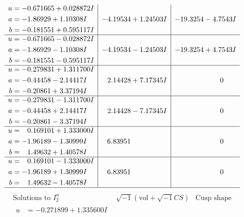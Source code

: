 \documentclass[1p]{elsarticle_modified}
\theoremstyle{definition}
\newcommand{\I}{\sqrt{-1}}
\begin{document}
$$\begin{array}{c|c|c}
\begin{aligned}
u &= -0.671665 + 0.028872 I \\
a &= -1.86929 + 1.10308 I \\
b &= -0.181551 + 0.595117 I\end{aligned}
 & -4.19534 + 1.24503 I & -19.3254 - 4.7543 I \\ \hline\begin{aligned}
u &= -0.671665 - 0.028872 I \\
a &= -1.86929 - 1.10308 I \\
b &= -0.181551 - 0.595117 I\end{aligned}
 & -4.19534 - 1.24503 I & -19.3254 + 4.7543 I \\ \hline\begin{aligned}
u &= -0.279831 + 1.311700 I \\
a &= -0.44458 - 2.14417 I \\
b &= -0.20861 + 3.37194 I\end{aligned}
 & \phantom{-}2.14428 + 7.17345 I & \phantom{-0.000000 } 0 \\ \hline\begin{aligned}
u &= -0.279831 - 1.311700 I \\
a &= -0.44458 + 2.14417 I \\
b &= -0.20861 - 3.37194 I\end{aligned}
 & \phantom{-}2.14428 - 7.17345 I & \phantom{-0.000000 } 0 \\ \hline\begin{aligned}
u &= \phantom{-}0.169101 + 1.333000 I \\
a &= -1.96189 - 1.30999 I \\
b &= \phantom{-}1.49632 + 1.40578 I\end{aligned}
 & \phantom{-}6.83951\phantom{ +0.000000I} & \phantom{-0.000000 } 0 \\ \hline\begin{aligned}
u &= \phantom{-}0.169101 - 1.333000 I \\
a &= -1.96189 + 1.30999 I \\
b &= \phantom{-}1.49632 - 1.40578 I\end{aligned}
 & \phantom{-}6.83951\phantom{ +0.000000I} & \phantom{-0.000000 } 0\\
 \hline 
 \end{array}$$\newpage$$\begin{array}{c|c|c}  
\text{Solutions to }I^u_{2}& \I (\text{vol} + \sqrt{-1}CS) & \text{Cusp shape}\\
 \hline 
\begin{aligned}
u &= -0.271899 + 1.335600 I \\

\end{aligned}
\end{array}$$
\end{document}
